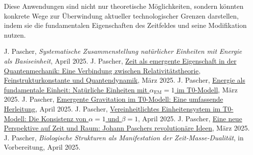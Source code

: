 \documentclass[12pt,a4paper]{article}
\newcommand{\alphaEM}{\alpha_{\text{EM}}}
\begin{document}
	Diese Anwendungen sind nicht nur theoretische Möglichkeiten, sondern könnten konkrete Wege zur Überwindung aktueller technologischer Grenzen darstellen, indem sie die fundamentalen Eigenschaften des Zeitfeldes und seine Modifikation nutzen.
	
	
	\begin{thebibliography}{99}
		 J. Pascher, \textit{Systematische Zusammenstellung natürlicher Einheiten mit Energie als Basiseinheit}, April 2025.
		 J. Pascher, \href{https://github.com/jpascher/T0-Time-Mass-Duality/tree/main/2/pdf/German/ZeitEmergentQM.pdf}{Zeit als emergente Eigenschaft in der Quantenmechanik: Eine Verbindung zwischen Relativitätstheorie, Feinstrukturkonstante und Quantendynamik}, März 2025.
		 J. Pascher, \href{https://github.com/jpascher/T0-Time-Mass-Duality/tree/main/2/pdf/German/NatEinheitenAlpha1.pdf}{Energie als fundamentale Einheit: Natürliche Einheiten mit $\alphaEM = 1$ im T0-Modell}, März 2025.
		 J. Pascher, \href{https://github.com/jpascher/T0-Time-Mass-Duality/tree/main/2/pdf/German/EmergentGravT0.pdf}{Emergente Gravitation im T0-Modell: Eine umfassende Herleitung}, April 2025.
		 J. Pascher, \href{https://github.com/jpascher/T0-Time-Mass-Duality/tree/main/2/pdf/German/Alpha1Beta1Konsistenz.pdf}{Vereinheitlichtes Einheitensystem im T0-Modell: Die Konsistenz von $\alpha = 1$ und $\beta = 1$}, April 2025.
		 J. Pascher, \href{https://github.com/jpascher/T0-Time-Mass-Duality/tree/main/2/pdf/German/ZeitRaumPascher.pdf}{Eine neue Perspektive auf Zeit und Raum: Johann Paschers revolutionäre Ideen}, März 2025.
		 J. Pascher, \textit{Biologische Strukturen als Manifestation der Zeit-Masse-Dualität}, in Vorbereitung, April 2025.
	\end{thebibliography}
	
	
\end{document}
